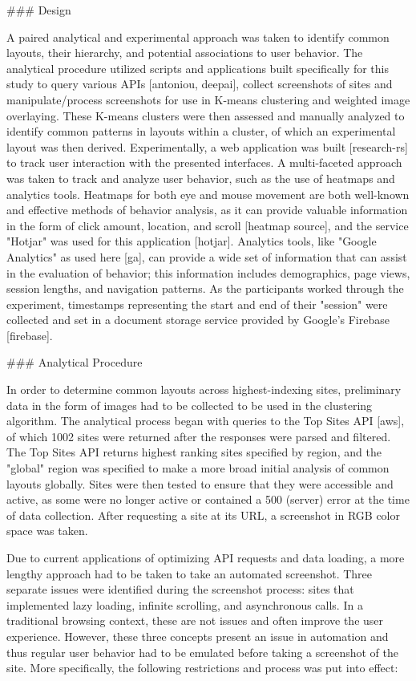 ### Design

A paired analytical and experimental approach was taken to identify common layouts, their hierarchy, and potential associations to user behavior. The analytical procedure utilized scripts and applications \cite{sorin_2020} built specifically for this study to query various APIs [antoniou, deepai], collect screenshots of sites and manipulate/process screenshots for use in K-means clustering and weighted image overlaying. These K-means clusters were then assessed and manually analyzed to identify common patterns in layouts within a cluster, of which an experimental layout was then derived. Experimentally, a web application was built [research-rs] to track user interaction with the presented interfaces. A multi-faceted approach was taken to track and analyze user behavior, such as the use of heatmaps and analytics tools. Heatmaps for both eye and mouse movement are both well-known and effective methods of behavior analysis, as it can provide valuable information in the form of click amount, location, and scroll [heatmap source], and the service "Hotjar" was used for this application [hotjar]. Analytics tools, like "Google Analytics" as used here [ga], can provide a wide set of information that can assist in the evaluation of behavior; this information includes demographics, page views, session lengths, and navigation patterns. As the participants worked through the experiment, timestamps representing the start and end of their "session" were collected and set in a document storage service provided by Google's Firebase [firebase].

### Analytical Procedure

In order to determine common layouts across highest-indexing sites, preliminary data in the form of images had to be collected to be used in the clustering algorithm. The analytical process began with queries to the Top Sites API [aws], of which 1002 sites were returned after the responses were parsed and filtered. The Top Sites API returns highest ranking sites specified by region, and the "global" region was specified to make a more broad initial analysis of common layouts globally. Sites were then tested to ensure that they were accessible and active, as some were no longer active or contained a 500 (server) error at the time of data collection. After requesting a site at its URL, a screenshot in RGB color space was taken.

Due to current applications of optimizing API requests and data loading, a more lengthy approach had to be taken to take an automated screenshot. Three separate issues were identified during the screenshot process: sites that implemented lazy loading, infinite scrolling, and asynchronous calls. In a traditional browsing context, these are not issues and often improve the user experience. However, these three concepts present an issue in automation and thus regular user behavior had to be emulated before taking a screenshot of the site. More specifically, the following restrictions and process was put into effect:

